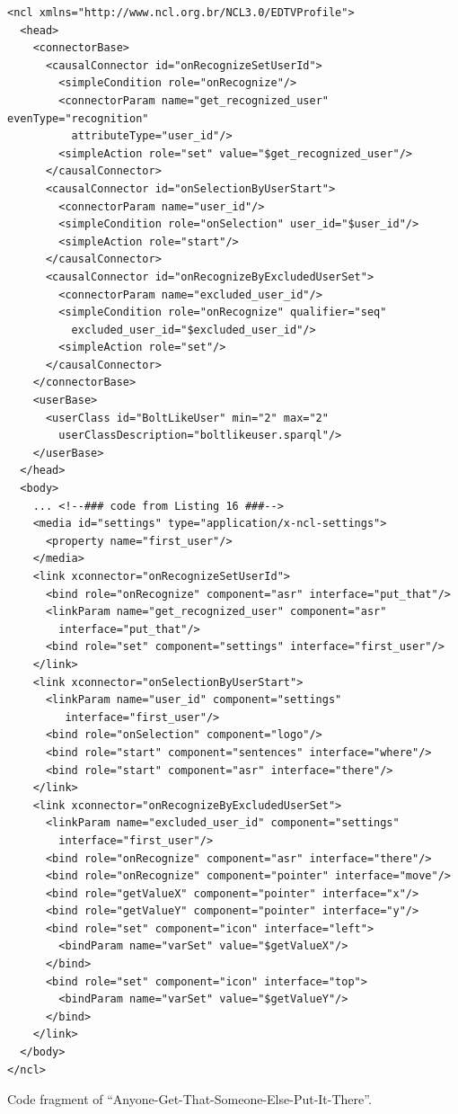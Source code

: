 \documentclass[
  doutorado,
  american
]{ThesisPUC}
\begin{document}
\begin{verbatim}
<ncl xmlns="http://www.ncl.org.br/NCL3.0/EDTVProfile">
  <head>
    <connectorBase>
      <causalConnector id="onRecognizeSetUserId">
        <simpleCondition role="onRecognize"/>
        <connectorParam name="get_recognized_user" evenType="recognition" 
          attributeType="user_id"/>
        <simpleAction role="set" value="$get_recognized_user"/>
      </causalConnector>
      <causalConnector id="onSelectionByUserStart">
        <connectorParam name="user_id"/>
        <simpleCondition role="onSelection" user_id="$user_id"/>
        <simpleAction role="start"/>
      </causalConnector>
      <causalConnector id="onRecognizeByExcludedUserSet">
        <connectorParam name="excluded_user_id"/>
        <simpleCondition role="onRecognize" qualifier="seq" 
          excluded_user_id="$excluded_user_id"/>
        <simpleAction role="set"/>
      </causalConnector>
    </connectorBase>
    <userBase>
      <userClass id="BoltLikeUser" min="2" max="2" 
        userClassDescription="boltlikeuser.sparql"/>
    </userBase>
  </head>
  <body>
    ... <!--### code from Listing 16 ###-->
    <media id="settings" type="application/x-ncl-settings">
      <property name="first_user"/>
    </media>
    <link xconnector="onRecognizeSetUserId">
      <bind role="onRecognize" component="asr" interface="put_that"/>
      <linkParam name="get_recognized_user" component="asr" 
        interface="put_that"/>
      <bind role="set" component="settings" interface="first_user"/>
    </link>
    <link xconnector="onSelectionByUserStart">
      <linkParam name="user_id" component="settings"
         interface="first_user"/>
      <bind role="onSelection" component="logo"/>
      <bind role="start" component="sentences" interface="where"/>
      <bind role="start" component="asr" interface="there"/>
    </link>
    <link xconnector="onRecognizeByExcludedUserSet">
      <linkParam name="excluded_user_id" component="settings" 
        interface="first_user"/>
      <bind role="onRecognize" component="asr" interface="there"/>
      <bind role="onRecognize" component="pointer" interface="move"/>
      <bind role="getValueX" component="pointer" interface="x"/>
      <bind role="getValueY" component="pointer" interface="y"/>
      <bind role="set" component="icon" interface="left">
        <bindParam name="varSet" value="$getValueX"/>
      </bind>
      <bind role="set" component="icon" interface="top">
        <bindParam name="varSet" value="$getValueY"/>
      </bind>
    </link>
  </body>
</ncl>
\end{verbatim}
\begin{listing}[!ht]
\caption{Code fragment of “Anyone-Get-That-Someone-Else-Put-It-There”.}
\label{list:annexb7}
\end{listing}
\end{document}
